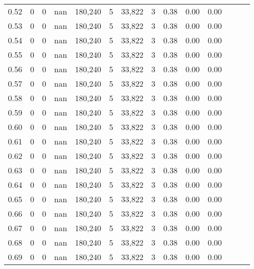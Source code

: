 \begin{tabular}{rrrrrrrrrrrrrr}
0.52 &       0 &      0 &   nan &  180,240 &        5 &  33,822 &       3 &  0.38 &  0.00 &      0.00 \\
0.53 &       0 &      0 &   nan &  180,240 &        5 &  33,822 &       3 &  0.38 &  0.00 &      0.00 \\
0.54 &       0 &      0 &   nan &  180,240 &        5 &  33,822 &       3 &  0.38 &  0.00 &      0.00 \\
0.55 &       0 &      0 &   nan &  180,240 &        5 &  33,822 &       3 &  0.38 &  0.00 &      0.00 \\
0.56 &       0 &      0 &   nan &  180,240 &        5 &  33,822 &       3 &  0.38 &  0.00 &      0.00 \\
0.57 &       0 &      0 &   nan &  180,240 &        5 &  33,822 &       3 &  0.38 &  0.00 &      0.00 \\
0.58 &       0 &      0 &   nan &  180,240 &        5 &  33,822 &       3 &  0.38 &  0.00 &      0.00 \\
0.59 &       0 &      0 &   nan &  180,240 &        5 &  33,822 &       3 &  0.38 &  0.00 &      0.00 \\
0.60 &       0 &      0 &   nan &  180,240 &        5 &  33,822 &       3 &  0.38 &  0.00 &      0.00 \\
0.61 &       0 &      0 &   nan &  180,240 &        5 &  33,822 &       3 &  0.38 &  0.00 &      0.00 \\
0.62 &       0 &      0 &   nan &  180,240 &        5 &  33,822 &       3 &  0.38 &  0.00 &      0.00 \\
0.63 &       0 &      0 &   nan &  180,240 &        5 &  33,822 &       3 &  0.38 &  0.00 &      0.00 \\
0.64 &       0 &      0 &   nan &  180,240 &        5 &  33,822 &       3 &  0.38 &  0.00 &      0.00 \\
0.65 &       0 &      0 &   nan &  180,240 &        5 &  33,822 &       3 &  0.38 &  0.00 &      0.00 \\
0.66 &       0 &      0 &   nan &  180,240 &        5 &  33,822 &       3 &  0.38 &  0.00 &      0.00 \\
0.67 &       0 &      0 &   nan &  180,240 &        5 &  33,822 &       3 &  0.38 &  0.00 &      0.00 \\
0.68 &       0 &      0 &   nan &  180,240 &        5 &  33,822 &       3 &  0.38 &  0.00 &      0.00 \\
0.69 &       0 &      0 &   nan &  180,240 &        5 &  33,822 &       3 &  0.38 &  0.00 &      0.00 \\

\end{tabular}
